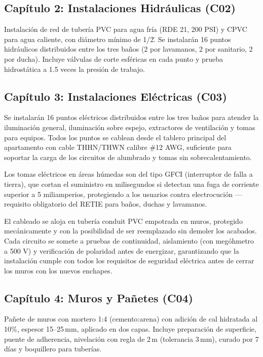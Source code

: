 ﻿\documentclass[12pt]{article}
\begin{document}
\subsection{Capítulo 2: Instalaciones Hidráulicas (C02)}

Instalación de red de tubería PVC para agua fría (RDE 21, 200 PSI) y CPVC para agua
caliente, con diámetro mínimo de 1/2\". Se instalarán 16 puntos hidráulicos
distribuidos entre los tres baños (2 por lavamanos, 2 por sanitario, 2 por ducha). Incluye válvulas
de corte esféricas en cada punto y prueba hidrostática a 1.5 veces la presión de trabajo.

\subsection{Capítulo 3: Instalaciones Eléctricas (C03)}

Se instalarán 16 puntos eléctricos distribuidos entre los tres baños para atender la iluminación general, iluminación sobre espejo, extractores de ventilación y tomas para equipos. Todos los puntos se cablean desde el tablero principal del apartamento con cable THHN/THWN calibre \#12 AWG, suficiente para soportar la carga de los circuitos de alumbrado y tomas sin sobrecalentamiento.

Los tomas eléctricos en áreas húmedas son del tipo GFCI (interruptor de falla a tierra), que cortan el suministro en milisegundos si detectan una fuga de corriente superior a 5 miliamperios, protegiendo a los usuarios contra electrocución —requisito obligatorio del RETIE para baños, duchas y lavamanos.

El cableado se aloja en tubería conduit PVC empotrada en muros, protegido mecánicamente y con la posibilidad de ser reemplazado sin demoler los acabados. Cada circuito se somete a pruebas de continuidad, aislamiento (con megóhmetro a 500 V) y verificación de polaridad antes de energizar, garantizando que la instalación cumple con todos los requisitos de seguridad eléctrica antes de cerrar los muros con los nuevos enchapes.

\subsection{Capítulo 4: Muros y Pañetes (C04)}

Pañete de muros con mortero 1:4 (cemento:arena) con adición de cal hidratada al 10\%, espesor
15--25\,mm, aplicado en dos capas. Incluye preparación de superficie, puente de adherencia, nivelación
con regla de 2\,m (tolerancia 3\,mm), curado por 7 días y boquillero para tuberías.
\end{document}
